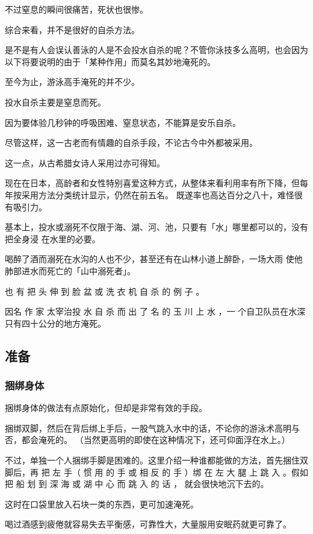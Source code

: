 \documentclass[UTF8]{ctexart}
\begin{document}
不过窒息的瞬间很痛苦，死状也很惨。

综合来看，并不是很好的自杀方法。

是不是有人会误认善泳的人是不会投水自杀的呢？不管你泳技多么高明，也会因为以下将要说明的由于「某种作用」而莫名其妙地淹死的。

至今为止，游泳高手淹死的并不少。

投水自杀主要是窒息而死。

因为要体验几秒钟的呼吸困难、窒息状态，不能算是安乐自杀。

尽管这样，这一古老而有情趣的自杀手段，不论古今中外都被采用。

这一点，从古希腊女诗人采用过亦可得知。

现在在日本，高龄者和女性特别喜爱这种方式，从整体来看利用率有所下降，但每年按采用方法分类统计显示，仍然在前五名。
既遂率也高达百分之八十，难怪很 有吸引力。 

基本上，投水或溺死不仅限于海、湖、河、池，只要有「水」哪里都可以的，没有把全身浸 在水里的必要。

喝醉了酒而溺死在水沟的人也不少，甚至还有在山林小道上醉卧，一场大雨 使他肺部进水而死亡的「山中溺死者」。

也 有 把 头 伸 到 脸 盆 或 洗 衣 机 自 杀 的 例 子 。

因名 作 家 太宰治投 水 自 杀 而 出 了 名 的 玉 川 上 水 ，一 个自卫队员在水深只有四十公分的地方淹死。

\subsection{准备}

\subsubsection*{捆绑身体}

捆绑身体的做法有点原始化，但却是非常有效的手段。

捆绑双脚，然后在背后绑上手后，一股气跳入水中的话，不论你的游泳术高明与否，都会淹死的。
（当然更高明的即使在这种情况下，还可仰面浮在水上。）

不过，单独一个人捆绑手脚是困难的。这里介绍一种谁都能做的方法，首先捆住双脚后，再 把 左 手（ 惯 用 的 手 或 相 反 的 手 ）绑 在 左 大 腿 上 跳 入 。假如 把 船 划 到 深 海 或 湖 中 心 而 跳 入 的 话 ， 就会很快地沉下去的。

这时在口袋里放入石块一类的东西，更可加速淹死。 

喝过酒感到疲倦就容易失去平衡感，可靠性大，大量服用安眠药就更可靠了。
\end{document}
